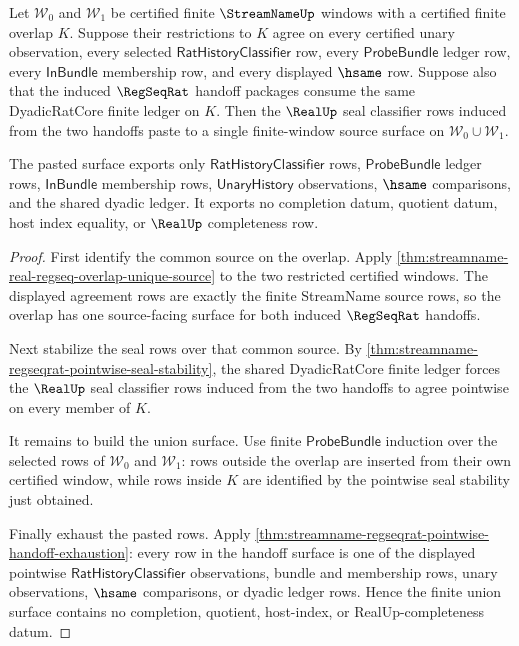 \begin{theorem}
\label{thm:streamname-regseqrat-pointwise-seal-pasting}
Let $\mathcal{W}_0$ and $\mathcal{W}_1$ be certified finite
$\StreamNameUp$ windows with a certified finite overlap $K$. Suppose their
restrictions to $K$ agree on every certified unary observation, every selected
$\mathsf{RatHistoryClassifier}$ row, every $\mathsf{ProbeBundle}$ ledger row,
every $\mathsf{InBundle}$ membership row, and every displayed $\hsame$ row.
Suppose also that the induced $\RegSeqRat$ handoff packages consume the same
DyadicRatCore finite ledger on $K$. Then the $\RealUp$ seal classifier rows
induced from the two handoffs paste to a single finite-window source surface
on $\mathcal{W}_0 \cup \mathcal{W}_1$.

The pasted surface exports only $\mathsf{RatHistoryClassifier}$ rows,
$\mathsf{ProbeBundle}$ ledger rows, $\mathsf{InBundle}$ membership rows,
$\mathsf{UnaryHistory}$ observations, $\hsame$ comparisons, and the shared
dyadic ledger. It exports no completion datum, quotient datum, host index
equality, or $\RealUp$ completeness row.
\end{theorem}
\begin{proof}
First identify the common source on the overlap. Apply
\autoref{thm:streamname-real-regseq-overlap-unique-source} to the two
restricted certified windows. The displayed agreement rows are exactly the
finite StreamName source rows, so the overlap has one source-facing surface
for both induced $\RegSeqRat$ handoffs.

Next stabilize the seal rows over that common source. By
\autoref{thm:streamname-regseqrat-pointwise-seal-stability}, the shared
DyadicRatCore finite ledger forces the $\RealUp$ seal classifier rows induced
from the two handoffs to agree pointwise on every member of $K$.

It remains to build the union surface. Use finite $\mathsf{ProbeBundle}$
induction over the selected rows of $\mathcal{W}_0$ and $\mathcal{W}_1$: rows
outside the overlap are inserted from their own certified window, while rows
inside $K$ are identified by the pointwise seal stability just obtained.

Finally exhaust the pasted rows. Apply
\autoref{thm:streamname-regseqrat-pointwise-handoff-exhaustion}: every row in
the handoff surface is one of the displayed pointwise
$\mathsf{RatHistoryClassifier}$ observations, bundle and membership rows,
unary observations, $\hsame$ comparisons, or dyadic ledger rows. Hence the
finite union surface contains no completion, quotient, host-index, or
RealUp-completeness datum.
\end{proof}

